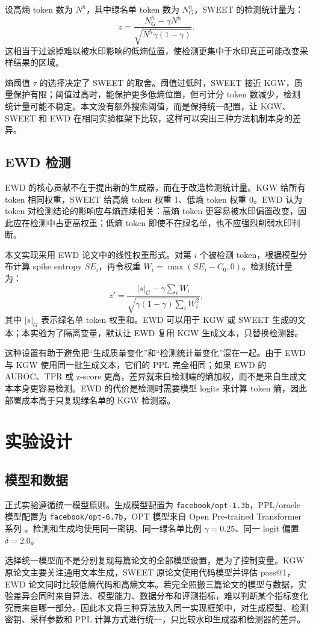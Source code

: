 \documentclass{SYSUReport}
\begin{document}
设高熵 token 数为 $N^h$，其中绿名单 token 数为 $N^h_G$，SWEET 的检测统计量为：
\[
z = \frac{N^h_G - \gamma N^h}{\sqrt{N^h\gamma(1-\gamma)}}.
\]
这相当于过滤掉难以被水印影响的低熵位置，使检测更集中于水印真正可能改变采样结果的区域。

熵阈值 $\tau$ 的选择决定了 SWEET 的取舍。阈值过低时，SWEET 接近 KGW，质量保护有限；阈值过高时，能保护更多低熵位置，但可计分 token 数减少，检测统计量可能不稳定。本文没有额外搜索阈值，而是保持统一配置，让 KGW、SWEET 和 EWD 在相同实验框架下比较，这样可以突出三种方法机制本身的差异。

\subsection{EWD 检测}
EWD 的核心贡献不在于提出新的生成器，而在于改造检测统计量。KGW 给所有 token 相同权重，SWEET 给高熵 token 权重 1、低熵 token 权重 0。EWD 认为 token 对检测结论的影响应与熵连续相关：高熵 token 更容易被水印偏置改变，因此应在检测中占更高权重；低熵 token 即使不在绿名单，也不应强烈削弱水印判断。

本文实现采用 EWD 论文中的线性权重形式。对第 $i$ 个被检测 token，根据模型分布计算 spike entropy $SE_i$，再令权重 $W_i=\max(SE_i-C_0,0)$。检测统计量为：
\[
z' = \frac{|s|_G - \gamma\sum_i W_i}{\sqrt{\gamma(1-\gamma)\sum_i W_i^2}},
\]
其中 $|s|_G$ 表示绿名单 token 权重和。EWD 可以用于 KGW 或 SWEET 生成的文本；本实验为了隔离变量，默认让 EWD 复用 KGW 生成文本，只替换检测器。

这种设置有助于避免把“生成质量变化”和“检测统计量变化”混在一起。由于 EWD 与 KGW 使用同一批生成文本，它们的 PPL 完全相同；如果 EWD 的 AUROC、TPR 或 z-score 更高，差异就来自检测端的熵加权，而不是来自生成文本本身更容易检测。EWD 的代价是检测时需要模型 logits 来计算 token 熵，因此部署成本高于只复现绿名单的 KGW 检测器。

\section{实验设计}
\subsection{模型和数据}
正式实验遵循统一模型原则。生成模型配置为 \texttt{facebook/opt-1.3b}，PPL/oracle 模型配置为 \texttt{facebook/opt-6.7b}，OPT 模型来自 Open Pre-trained Transformer 系列 \cite{zhang2022opt}。检测和生成均使用同一密钥、同一绿名单比例 $\gamma=0.25$、同一 logit 偏置 $\delta=2.0$。

选择统一模型而不是分别复现每篇论文的全部模型设置，是为了控制变量。KGW 原论文主要关注通用文本生成，SWEET 原论文使用代码模型并评估 pass@1，EWD 论文同时比较低熵代码和高熵文本。若完全照搬三篇论文的模型与数据，实验差异会同时来自算法、模型能力、数据分布和评测指标，难以判断某个指标变化究竟来自哪一部分。因此本文将三种算法放入同一实现框架中，对生成模型、检测密钥、采样参数和 PPL 计算方式进行统一，只比较水印生成器和检测器的差异。
\end{document}
